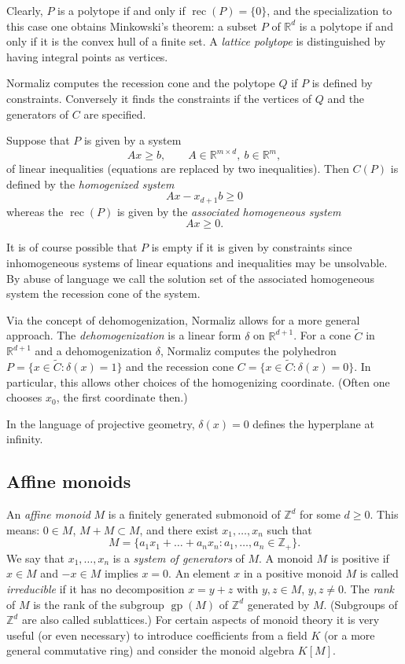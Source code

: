 \documentclass[12pt,a4paper]{scrartcl}
\theoremstyle{definition}
\def\ZZ{{\mathbb Z}}
\def\RR{{\mathbb R}}
\DeclareMathOperator{\gp}{gp}
\DeclareMathOperator{\rec}{rec}
\begin{document}
Clearly, $P$ is a polytope if and only if $\rec(P)=\{0\}$, and the specialization to this case one obtains Minkowski's theorem: a subset $P$ of $\RR^d$ is a polytope if and only if it is the convex hull of a finite set. A \emph{lattice polytope} is distinguished by having integral points as vertices.

Normaliz computes the recession cone and the polytope $Q$ if $P$ is defined by constraints. Conversely it finds the constraints if the vertices of $Q$ and the generators of $C$ are specified.

Suppose that $P$ is given by a system
$$
Ax\ge b, \qquad A\in\RR^{m\times d},\ b\in \RR^m,
$$
of linear inequalities (equations are replaced by two inequalities). Then $C(P)$ is defined by the \emph{homogenized system}
$$
Ax-x_{d+1}b\ge 0
$$
whereas the $\rec(P)$ is given by the \emph{associated homogeneous system}
$$
Ax\ge 0.
$$

It is of course possible that $P$ is empty if it is given by constraints since inhomogeneous systems of linear equations and inequalities may be unsolvable. By abuse of language we call the solution set of the associated homogeneous system the recession cone of the system.

Via the concept of dehomogenization, Normaliz allows for a more general approach. The \emph{dehomogenization} is a linear form $\delta$ on $\RR^{d+1}$. For a cone $\widetilde C$ in $\RR^{d+1}$ and a dehomogenization $\delta$, Normaliz computes the polyhedron $P=\{x\in \widetilde C: \delta(x)=1\}$ and the recession cone $C=\{x\in \widetilde C: \delta(x)=0\}$. In particular, this allows other choices of the homogenizing coordinate. (Often one chooses $x_0$, the first coordinate then.)

In the language of projective geometry, $\delta(x)=0$ defines the hyperplane at infinity.

\subsection{Affine monoids}

An \emph{affine monoid} $M$ is a finitely generated submonoid of $\ZZ^d$ for some $d\ge0$. This means: $0\in M$, $M+M\subset M$, and there exist $x_1,\dots,x_n$ such that
$$
M=\{a_1x_1+\dots+a_nx_n: a_1,\dots,a_n\in\ZZ_+\}.
$$
We say that $x_1,\dots,x_n$ is a \emph{system of generators} of $M$. A monoid $M$ is positive if $x\in M$ and $-x\in M$ implies $x=0$. An element $x$ in a positive monoid $M$ is called \emph{irreducible} if it has no decomposition $x=y+z$ with $y,z\in M$, $y,z\neq0$. The \emph{rank} of $M$ is the rank of the subgroup $\gp(M)$ of $\ZZ^d$ generated by $M$. (Subgroups of $\ZZ^d$ are also called sublattices.)
For certain aspects of monoid theory it is very useful (or even necessary) to introduce coefficients from a field $K$ (or a more general commutative ring) and consider the monoid algebra $K[M]$.
\end{document}
